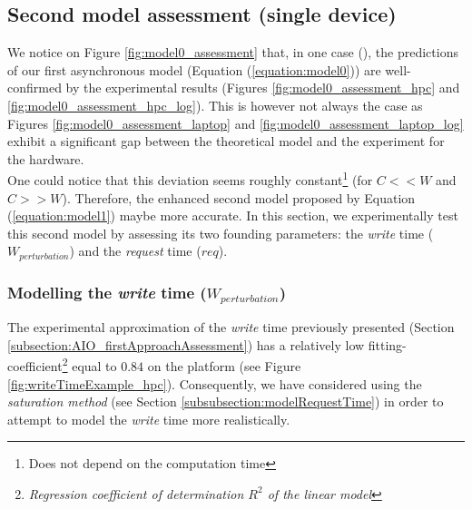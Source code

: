 	\subsection{Second model assessment (single \notationIO\space device)} 
		We notice on Figure \ref{fig:model0_assessment} that, in one case (\targetPlatformLaptop), the predictions of our first asynchronous model (Equation (\ref{equation:model0})) are well-confirmed by the experimental results (Figures \ref{fig:model0_assessment_hpc} and \ref{fig:model0_assessment_hpc_log}).   This is however not always the case as Figures \ref{fig:model0_assessment_laptop} and \ref{fig:model0_assessment_laptop_log} exhibit a significant gap between the theoretical model and the experiment for the \targetPlatformLaptop\space hardware.\\
		One could notice that this deviation seems roughly constant\footnote{Does not depend on the computation time} (for $C<<W$ and $C>>W$).   Therefore, the enhanced second model proposed by Equation (\ref{equation:model1}) maybe more accurate.   In this section, we experimentally test this second model by assessing its two founding parameters: the \emph{write} time ($W_{perturbation}$) and the \notationaio\space \emph{request} time ($req$).


		\subsubsection{Modelling the \emph{write} time ($W_{perturbation}$)}
			The experimental approximation of the \emph{write} time previously presented (Section \ref{subsection:AIO_firstApproachAssessment}) has a relatively low fitting-coefficient\footnote{\emph{Regression coefficient of determination $R^{2}$ of the linear model}} equal to $0.84$ on the \targetPlatformHpc\space platform (see Figure \ref{fig:writeTimeExample_hpc}).   Consequently, we have considered using the \emph{saturation method} (see Section \ref{subsubsection:modelRequestTime}) in order to attempt to model the \emph{write} time more realistically.\\

